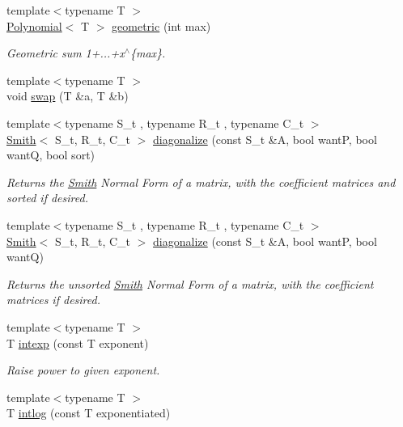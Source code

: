 \begin{DoxyCompactItemize}
\item 
{\footnotesize template$<$typename T $>$ }\\\hyperlink{classMackey_1_1Polynomial}{Polynomial}$<$ T $>$ \hyperlink{namespaceMackey_a2b9319a9af0a3cad8cfec47e9197dc82}{geometric} (int max)
\begin{DoxyCompactList}\small\item\em Geometric sum 1+...+x$^\wedge$\{max\}. \end{DoxyCompactList}\item 
{\footnotesize template$<$typename T $>$ }\\void \hyperlink{namespaceMackey_aabed38680919594c4ba5eaa6730a7f82}{swap} (T \&a, T \&b)
\item 
{\footnotesize template$<$typename S\+\_\+t , typename R\+\_\+t , typename C\+\_\+t $>$ }\\\hyperlink{classMackey_1_1Smith}{Smith}$<$ S\+\_\+t, R\+\_\+t, C\+\_\+t $>$ \hyperlink{namespaceMackey_a276ffc8b4c9c52cfde39cd3da3c88cc9}{diagonalize} (const S\+\_\+t \&A, bool wantP, bool wantQ, bool sort)
\begin{DoxyCompactList}\small\item\em Returns the \hyperlink{classMackey_1_1Smith}{Smith} Normal Form of a matrix, with the coefficient matrices and sorted if desired. \end{DoxyCompactList}\item 
{\footnotesize template$<$typename S\+\_\+t , typename R\+\_\+t , typename C\+\_\+t $>$ }\\\hyperlink{classMackey_1_1Smith}{Smith}$<$ S\+\_\+t, R\+\_\+t, C\+\_\+t $>$ \hyperlink{namespaceMackey_a2f26791310db25c7e42bf5341fdfd48d}{diagonalize} (const S\+\_\+t \&A, bool wantP, bool wantQ)
\begin{DoxyCompactList}\small\item\em Returns the unsorted \hyperlink{classMackey_1_1Smith}{Smith} Normal Form of a matrix, with the coefficient matrices if desired. \end{DoxyCompactList}\item 
{\footnotesize template$<$typename T $>$ }\\T \hyperlink{namespaceMackey_a4904fdc0fdcf3c23d7f3b80f59b2eafa}{intexp} (const T exponent)
\begin{DoxyCompactList}\small\item\em Raise power to given exponent. \end{DoxyCompactList}\item 
{\footnotesize template$<$typename T $>$ }\\T \hyperlink{namespaceMackey_aa0cac9097035c5fe8448742e22e6f78b}{intlog} (const T exponentiated)

\end{DoxyCompactItemize}
